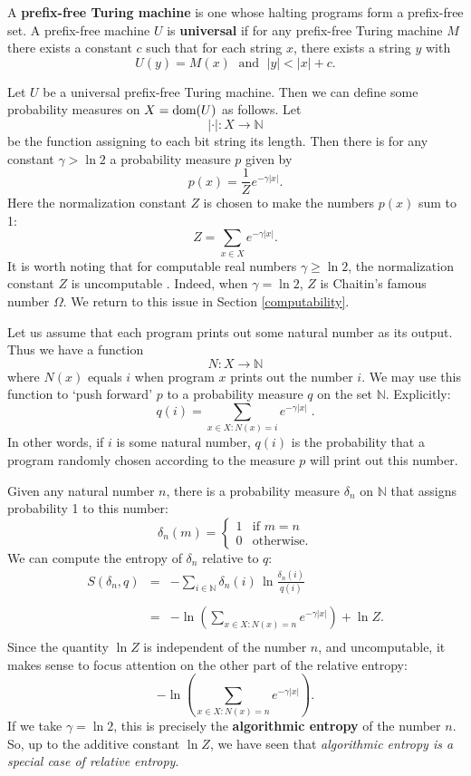 \documentclass[12pt,twoside,openright]{report}
\newcommand{\maps}{\colon}
\newcommand{\N}{\mathbb{N}}
\newcommand{\dom}{\mbox{\rm dom}}
\begin{document}
A \textbf{prefix-free Turing machine} is one whose halting programs form a prefix-free set.  A prefix-free machine $U$ is {\bf universal}
if for any prefix-free Turing machine $M$ there exists a constant
$c$ such that for each string $x$, there exists a string $y$ with
\[ U(y) = M(x) \; \mbox{ and } \; |y| < |x| + c. \]

Let $U$ be a universal prefix-free Turing machine.  Then we can define some probability measures on $X = \dom(U)$
as follows.   Let 
\[  |\cdot | \maps X \to \N \]
be the function assigning to each bit string its length. Then there is for any constant $\gamma > \ln 2$ a probability measure 
$p$ given by
\[   p(x) = \frac{1}{Z} e^{-\gamma |x|}. \]
Here the normalization constant $Z$ is chosen to make the numbers
$p(x)$ sum to 1:
\[   Z = \sum_{x \in X} e^{-\gamma |x|}  .\]
It is worth noting that for computable real numbers $\gamma \ge \ln 2$, the normalization constant $Z$ is uncomputable \cite{Tadaki2002}. Indeed, when $\gamma = \ln 2$, $Z$ is Chaitin's famous number $\Omega$. We return to this issue in Section \ref{computability}.

Let us assume that each program prints out some natural number as its output.   Thus we have a function
\[ N \maps X \to \N \]
where $N(x)$ equals $i$ when program $x$ prints out the number $i$. We may use this function to `push forward' $p$ to a probability measure
$q$ on the set $\N$.  Explicitly:
\[ 
   q(i) = \displaystyle {\sum_{x \in X : N(x) = i}} e^{-\gamma |x|} \; .
\]
In other words, if $i$ is some natural number, $q(i)$ is the probability that a program randomly chosen according to the measure
$p$ will print out this number.  

Given any natural number $n$, there is a probability measure
$\delta_n$ on $\N$ that assigns probability 1 to this number:
\[   \delta_n(m) = \left\{ \begin{array}{cl} 1 & \textrm{if } m = n \\
                              0 & \textrm{otherwise.}  
           \end{array} \right.
\]
We can compute the entropy of $\delta_n$ relative to $q$:
\begin{equation}
\label{relative.entropy}
\begin{array}{ccl} S(\delta_n,q) &=& 
\displaystyle{ -\sum_{i \in \N}  \delta_n(i) \, 
\ln \frac{\delta_n(i)}{q(i)}}   \\
\\ &=& \displaystyle{ -\ln \left( \sum_{x \in X \colon N(x) = n} 
e^{-\gamma |x|} \right) + \ln Z .}  \\
\end{array}
\end{equation}
Since the quantity $\ln Z$ is independent of the number $n$, and uncomputable, it makes sense to focus attention on the other part of the relative entropy:
\[  \displaystyle{ -\ln \left( \sum_{x \in X \colon N(x) = n} 
e^{-\gamma |x|} \right) .}  
\]
If we take $\gamma = \ln 2$, this is precisely the \textbf{algorithmic entropy} \cite{Chaitin1976,LevinZvonkin} of the number $n$.  So, up to the additive constant $\ln Z$, we have seen that \textit{algorithmic entropy is a special case of relative entropy}.  
\end{document}
